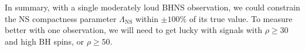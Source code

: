 \documentclass[aps,prd,amsmath,floats,floatfix, twocolumn,
superscriptaddress,nofootinbib,showpacs]{revtex4-1}
\newcommand{\red}{\textcolor{red}}
\newcommand{\prayush}{\textcolor{red!40!black}}
\newcommand{\lambdans}{\Lambda_\mathrm{NS}}
\newcommand{\chibh}{\chi_\mathrm{BH}}
\begin{document}



In summary, with a single moderately loud BHNS observation, we could constrain
the NS compactness parameter $\lambdans$ within $\pm 100\%$ of its true value.
To measure better with one observation, we will need to get lucky with signals
with $\rho\geq 30$ and high BH spins, or $\rho\geq 50$.



\end{document}
